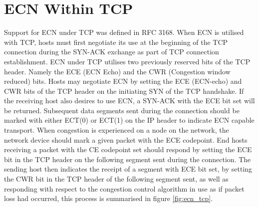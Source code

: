 \documentclass{l4proj}
\begin{document}
\section{ECN Within TCP}
\label{sec:ecntcp}

Support for ECN under TCP was defined in RFC 3168\cite{rfc3168}. When ECN is utilised with TCP, hosts must first negotiate its use at the beginning of the TCP connection during the SYN-ACK exchange as part of TCP connection establishment. ECN under TCP utilises two previously reserved bits of the TCP header. Namely the ECE (ECN Echo) and the CWR (Congestion window reduced) bits. Hosts may negotiate ECN by setting the ECE (ECN-echo) and CWR bits of the TCP header on the initiating SYN of the TCP handshake. If the receiving host also desires to use ECN, a SYN-ACK with the ECE bit set will be returned. Subsequent data segments sent during the connection should be marked with either ECT(0) or ECT(1) on the IP header to indicate ECN capable transport. When congestion is experienced on a node on the network, the network device should mark a given packet with the ECE codepoint. End hosts receiving a packet with the CE codepoint set should respond by setting the ECE bit in the TCP header on the following segment sent during the connection. The sending host then indicates the receipt of a segment with ECE bit set, by setting the CWR bit in the TCP header of the following segment sent, as well as responding with respect to the congestion control algorithm in use as if packet loss had occurred, this process is summarised in figure \ref{fig:ecn_tcp}.
\end{document}
